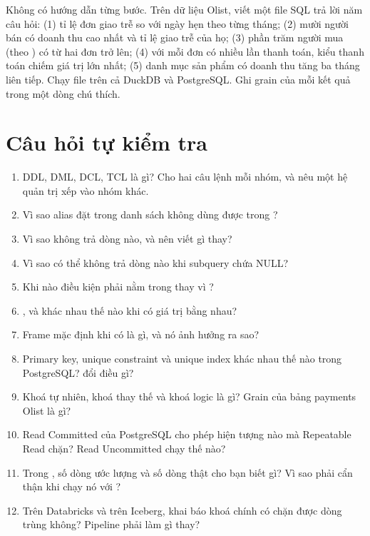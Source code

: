 \begin{thuthach}
Không có hướng dẫn từng bước. Trên dữ liệu Olist, viết một file SQL trả lời năm câu hỏi: (1) tỉ lệ đơn giao trễ so với ngày hẹn theo từng tháng; (2) mười người bán có doanh thu cao nhất và tỉ lệ giao trễ của họ; (3) phần trăm người mua (theo ) có từ hai đơn trở lên; (4) với mỗi đơn có nhiều lần thanh toán, kiểu thanh toán chiếm giá trị lớn nhất; (5) danh mục sản phẩm có doanh thu tăng ba tháng liên tiếp. Chạy file trên cả DuckDB và PostgreSQL. Ghi grain của mỗi kết quả trong một dòng chú thích.
\end{thuthach}

\section{Câu hỏi tự kiểm tra}

\begin{enumerate}
  \item DDL, DML, DCL, TCL là gì? Cho hai câu lệnh mỗi nhóm, và nêu một hệ quản trị xếp  vào nhóm khác.
  \item Vì sao alias đặt trong danh sách  không dùng được trong ?
  \item Vì sao  không trả dòng nào, và nên viết gì thay?
  \item Vì sao  có thể không trả dòng nào khi subquery chứa NULL?
  \item Khi nào điều kiện phải nằm trong  thay vì ?
  \item {},  và  khác nhau thế nào khi có giá trị bằng nhau?
  \item Frame mặc định khi có  là gì, và nó ảnh hưởng  ra sao?
  \item Primary key, unique constraint và unique index khác nhau thế nào trong PostgreSQL?  đổi điều gì?
  \item Khoá tự nhiên, khoá thay thế và khoá logic là gì? Grain của bảng payments Olist là gì?
  \item Read Committed của PostgreSQL cho phép hiện tượng nào mà Repeatable Read chặn? Read Uncommitted chạy thế nào?
  \item Trong , số dòng ước lượng và số dòng thật cho bạn biết gì? Vì sao phải cẩn thận khi chạy nó với ?
  \item Trên Databricks và trên Iceberg, khai báo khoá chính có chặn được dòng trùng không? Pipeline phải làm gì thay?
\end{enumerate}

